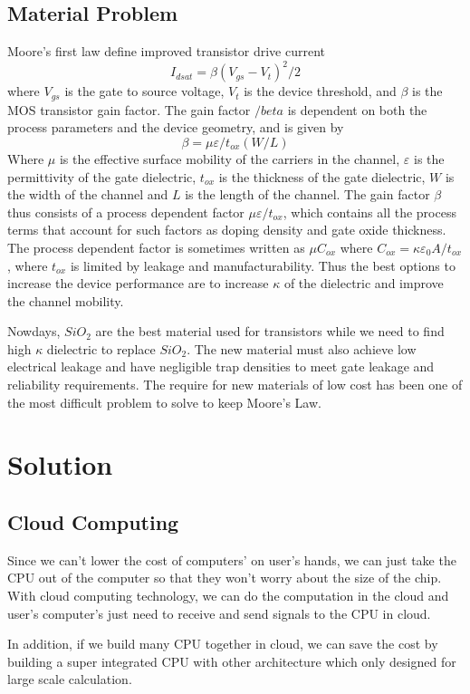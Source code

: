 \documentclass[12pt]{article}
\begin{document}
\subsection{Material Problem}
Moore's first law define improved transistor drive current $$I_{dsat}=\beta (V_{gs}-V_t)^2/2$$ where $V_{gs}$ is the gate to source voltage, $V_t$ is the device threshold, and $β$ is the MOS transistor gain factor. The gain factor $/beta$ is dependent on both the process parameters and the device geometry, and is given by  
$$\beta=\mu\varepsilon/t_{ox}(W/L)$$ Where $\mu$ is the effective surface mobility of the carriers in the channel, $\varepsilon$ is the permittivity of the gate dielectric, $t_{ox}$ is the thickness of the gate dielectric, $W$ is the width of the channel and $L$ is the length of the channel. The gain factor $\beta$ thus consists of a process dependent factor $\mu\varepsilon/t_{ox}$, which contains all the process terms that account for such factors as doping density and gate oxide thickness. The process dependent factor is sometimes written as $\mu C_{ox}$ where $C_{ox}=\kappa\varepsilon_0 A/t_{ox}$, where $t_{ox}$ is limited by leakage and manufacturability. Thus the best options to increase the device performance are to increase $\kappa$ of the dielectric and improve the channel mobility.
\par Nowdays, $SiO_2$ are the best material used for transistors while we need to find high $\kappa$ dielectric to replace $Si O_2$. The new material must also achieve low electrical leakage and have negligible trap densities to meet gate leakage and reliability requirements. The require for new materials of low cost has been one of the most difficult problem to solve to keep Moore's Law.
\section{Solution}
\subsection{Cloud Computing}
Since we can't lower the cost of computers' on user's hands, we can just take the CPU out of the computer so that they won't worry about the size of the chip. With cloud computing technology, we can do the computation in the cloud and user's computer's just need to receive and send signals to the CPU in cloud.
\par In addition, if we build many CPU together in cloud, we can save the cost by building a super integrated CPU with other architecture which only designed for large scale calculation.
\end{document}
